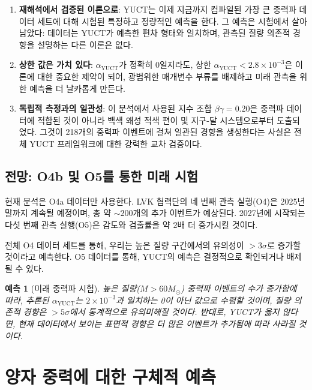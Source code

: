 \documentclass[11pt,a4paper]{article}
\newtheorem{prediction}[theorem]{예측}
\theoremstyle{remark}
\begin{document}
	\begin{enumerate}
		\item \textbf{재해석에서 검증된 이론으로}: YUCT는 이제 지금까지 컴파일된 가장 큰 중력파 데이터 세트에 대해 시험된 특정하고 정량적인 예측을 한다. 그 예측은 시험에서 살아남았다: 데이터는 YUCT가 예측한 편차 형태와 일치하며, 관측된 질량 의존적 경향을 설명하는 다른 이론은 없다.
		
		\item \textbf{상한 값은 가치 있다}: $\alpha_{\text{YUCT}}$가 정확히 0일지라도, 상한 $\alpha_{\text{YUCT}} < 2.8 \times 10^{-3}$은 이론에 대한 중요한 제약이 되어, 광범위한 매개변수 부류를 배제하고 미래 관측을 위한 예측을 더 날카롭게 만든다.
		
		\item \textbf{독립적 측정과의 일관성}: 이 분석에서 사용된 지수 조합 $\beta\gamma = 0.20$은 중력파 데이터에 적합된 것이 아니라 백색 왜성 적색 편이 및 지구-달 시스템으로부터 도출되었다. 그것이 218개의 중력파 이벤트에 걸쳐 일관된 경향을 생성한다는 사실은 전체 YUCT 프레임워크에 대한 강력한 교차 검증이다.
	\end{enumerate}
	
	\subsection{전망: O4b 및 O5를 통한 미래 시험}
	
	현재 분석은 O4a 데이터만 사용한다. LVK 협력단의 네 번째 관측 실행(O4)은 2025년 말까지 계속될 예정이며, 총 약 $\sim 200$개의 추가 이벤트가 예상된다. 2027년에 시작되는 다섯 번째 관측 실행(O5)은 감도와 검출률을 약 $2$배 더 증가시킬 것이다.
	
	전체 O4 데이터 세트를 통해, 우리는 높은 질량 구간에서의 유의성이 $> 3\sigma$로 증가할 것이라고 예측한다. O5 데이터를 통해, YUCT의 예측은 결정적으로 확인되거나 배제될 수 있다.
	
	\begin{prediction}[미래 중력파 시험]
		높은 질량($M > 60 M_\odot$) 중력파 이벤트의 수가 증가함에 따라, 추론된 $\alpha_{\text{YUCT}}$는 $2\times 10^{-3}$과 일치하는 0이 아닌 값으로 수렴할 것이며, 질량 의존적 경향은 $> 5\sigma$에서 통계적으로 유의미해질 것이다. 반대로, YUCT가 옳지 않다면, 현재 데이터에서 보이는 표면적 경향은 더 많은 이벤트가 추가됨에 따라 사라질 것이다.
	\end{prediction}
	
	\section{양자 중력에 대한 구체적 예측}
	\label{sec:predictions}
	
\end{document}
